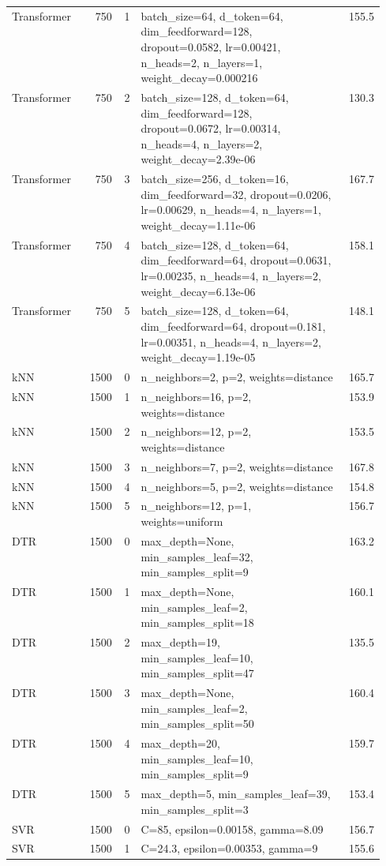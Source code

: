 \begin{longtable}{lrrp{0.55\linewidth}r}
Transformer & 750 & 1 & batch\_size=64, d\_token=64, dim\_feedforward=128, dropout=0.0582, lr=0.00421, n\_heads=2, n\_layers=1, weight\_decay=0.000216 & 155.5 \\
Transformer & 750 & 2 & batch\_size=128, d\_token=64, dim\_feedforward=128, dropout=0.0672, lr=0.00314, n\_heads=4, n\_layers=2, weight\_decay=2.39e-06 & 130.3 \\
Transformer & 750 & 3 & batch\_size=256, d\_token=16, dim\_feedforward=32, dropout=0.0206, lr=0.00629, n\_heads=4, n\_layers=1, weight\_decay=1.11e-06 & 167.7 \\
Transformer & 750 & 4 & batch\_size=128, d\_token=64, dim\_feedforward=64, dropout=0.0631, lr=0.00235, n\_heads=4, n\_layers=2, weight\_decay=6.13e-06 & 158.1 \\
Transformer & 750 & 5 & batch\_size=128, d\_token=64, dim\_feedforward=64, dropout=0.181, lr=0.00351, n\_heads=4, n\_layers=2, weight\_decay=1.19e-05 & 148.1 \\
\midrule
kNN & 1500 & 0 & n\_neighbors=2, p=2, weights=distance & 165.7 \\
kNN & 1500 & 1 & n\_neighbors=16, p=2, weights=distance & 153.9 \\
kNN & 1500 & 2 & n\_neighbors=12, p=2, weights=distance & 153.5 \\
kNN & 1500 & 3 & n\_neighbors=7, p=2, weights=distance & 167.8 \\
kNN & 1500 & 4 & n\_neighbors=5, p=2, weights=distance & 154.8 \\
kNN & 1500 & 5 & n\_neighbors=12, p=1, weights=uniform & 156.7 \\
DTR & 1500 & 0 & max\_depth=None, min\_samples\_leaf=32, min\_samples\_split=9 & 163.2 \\
DTR & 1500 & 1 & max\_depth=None, min\_samples\_leaf=2, min\_samples\_split=18 & 160.1 \\
DTR & 1500 & 2 & max\_depth=19, min\_samples\_leaf=10, min\_samples\_split=47 & 135.5 \\
DTR & 1500 & 3 & max\_depth=None, min\_samples\_leaf=2, min\_samples\_split=50 & 160.4 \\
DTR & 1500 & 4 & max\_depth=20, min\_samples\_leaf=10, min\_samples\_split=9 & 159.7 \\
DTR & 1500 & 5 & max\_depth=5, min\_samples\_leaf=39, min\_samples\_split=3 & 153.4 \\
SVR & 1500 & 0 & C=85, epsilon=0.00158, gamma=8.09 & 156.7 \\
SVR & 1500 & 1 & C=24.3, epsilon=0.00353, gamma=9 & 155.6 \\

\end{longtable}
